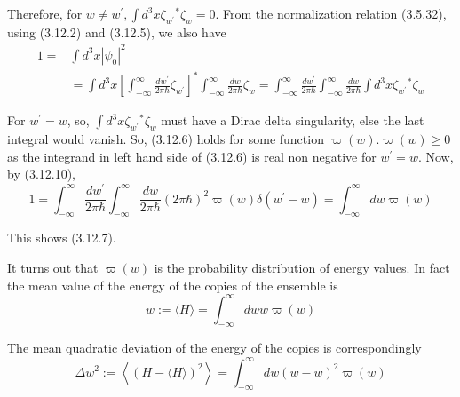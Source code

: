 \documentclass{article}
\begin{document}
Therefore, for $w \neq w^{\prime}, \int d^{3} x \zeta_{w^{\prime}}{ }^{*} \zeta_{w}=0$. From the normalization relation (3.5.32), using (3.12.2) and (3.12.5), we also have
$$
\begin{align*}
1= & \int d^{3} x\left|\psi_{0}\right|^{2}  \tag{3.12.10}\\
& =\int d^{3} x\left[\int_{-\infty}^{\infty} \frac{d w^{\prime}}{2 \pi \hbar} \zeta_{w^{\prime}}\right]^{*} \int_{-\infty}^{\infty} \frac{d w}{2 \pi \hbar} \zeta_{w}=\int_{-\infty}^{\infty} \frac{d w^{\prime}}{2 \pi \hbar} \int_{-\infty}^{\infty} \frac{d w}{2 \pi \hbar} \int d^{3} x \zeta_{w^{\prime}}{ }^{*} \zeta_{w}
\end{align*}
$$

For $w^{\prime}=w$, so, $\int d^{3} x \zeta_{w^{\prime}}{ }^{*} \zeta_{w}$ must have a Dirac delta singularity, else the last integral would vanish. So, (3.12.6) holds for some function $\varpi(w) . \varpi(w) \geq 0$ as the integrand in left hand side of (3.12.6) is real non negative for $w^{\prime}=w$. Now, by (3.12.10),
$$
1=\int_{-\infty}^{\infty} \frac{d w^{\prime}}{2 \pi \hbar} \int_{-\infty}^{\infty} \frac{d w}{2 \pi \hbar}(2 \pi \hbar)^{2} \varpi(w) \delta\left(w^{\prime}-w\right)=\int_{-\infty}^{\infty} d w \varpi(w)
$$

This shows (3.12.7).

It turns out that $\varpi(w)$ is the probability distribution of energy values. In fact the mean value of the energy of the copies of the ensemble is
$$
\begin{equation*}
\bar{w}:=\langle H\rangle=\int_{-\infty}^{\infty} d w w \varpi(w) \tag{3.12.11}
\end{equation*}
$$

The mean quadratic deviation of the energy of the copies is correspondingly
$$
\begin{equation*}
\Delta w^{2}:=\left\langle(H-\langle H\rangle)^{2}\right\rangle=\int_{-\infty}^{\infty} d w(w-\bar{w})^{2} \varpi(w) \tag{3.12.12}
\end{equation*}
$$
\end{document}
